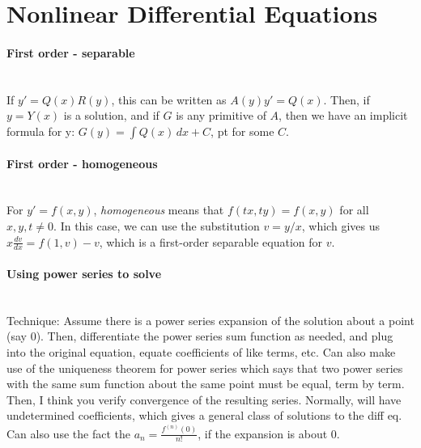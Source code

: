 \documentclass[10pt]{article}
\begin{document}
\bigskip\bigskip
\section{Nonlinear Differential Equations}\smallskip

\paragraph{First order - separable}\ \\
If $y'=Q(x)R(y)$, this can be written as $A(y)y'=Q(x)$.
Then, if $y=Y(x)$ is a solution, and if $G$ is any primitive of $A$, then we have
an implicit formula for y: $G(y)=\int Q(x)\,dx+C$,  pt for some $C$.

\paragraph{First order - homogeneous}\ \\
For $y'=f(x,y)$, {\it homogeneous} means that $f(tx,ty)=f(x,y)$ for all $x,y,t \neq 0$.
In this case, we can use the substitution $v=y/x$, which gives us
$x\frac{dv}{dx}=f(1,v)-v$, which is a first-order separable equation for $v$.

\paragraph{Using power series to solve}\ \\
Technique:  Assume there is a power series expansion of the solution about a point (say $0$).
Then, differentiate the power series sum function as needed, and plug into the original equation,
equate coefficients of like terms, etc.  Can also make use of the uniqueness theorem for power
series which says that two power series with the same sum function about the same point must 
be equal, term by term.  Then, I think you verify convergence of the resulting series.  Normally,
will have undetermined coefficients, which gives a general class of solutions to the diff eq.
Can also use the fact the $a_n=\frac{f^{(n)}(0)}{n!}$, if the expansion is about $0$.
\end{document}
